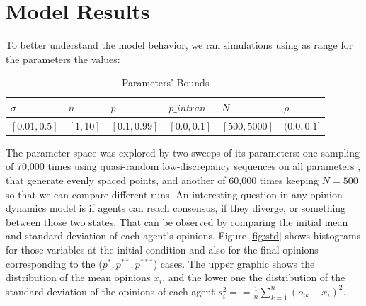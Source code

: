 \documentclass{article}
\begin{document}
  \section{Model Results}

  To better understand the model behavior, we ran simulations using as range for the parameters the values:  

  \begin{table}[H]
    \centering
\begin{tabular}{@{}|l|l|l|l|l|l|@{}}
\toprule
\rowcolor[HTML]{EFEFEF} 
$\sigma$ & $n$ & $p$ & $p\_intran$ & $N$ & $\rho$ \\ \midrule
$[0.01, 0.5]$ & $[1, 10]$  & $[0.1, 0.99]$ & $[0.0, 0.1]$ & $[500, 5000]$ & $(0.0, 0.1]$ \\ \bottomrule
\end{tabular}
\caption{Parameters' Bounds}
\end{table}


The parameter space was explored by two sweeps of its parameters: one sampling
of 70,000 times using quasi-random low-discrepancy sequences on all parameters
\cite{saltelli2008global}, that generate evenly spaced points, and another of
60,000 times keeping \(N=500\) so that we can compare different runs. An
interesting question in any opinion dynamics model is if agents can reach
consensus, if they diverge, or something between those two states. That can be observed by comparing the initial mean and standard
deviation of each agent's opinions. Figure \ref{fig:std} shows histograms for
those variables at the initial condition and also for the final opinions corresponding to the (\(p^{*}, p^{**}, p^{***}\)) cases. The upper graphic shows the distribution of the mean opinions $x_i$, and the lower one the distribution of the standard deviation of the opinions of each agent $s_i^2==
\frac{1}{n}
\sum_{k=1}^{n}
(o_{ik}-x_i)^2$.
\end{document}
